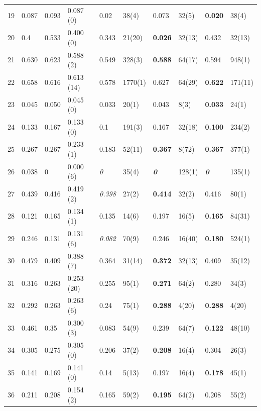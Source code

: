\begin{center}
\begin{supertabular}{|p{0.15cm}|p{1cm}ll|ll|ll|ll|}
19 & 0.087 & 0.093 & 0.087 (0)  & 0.02 & 38(4) & 0.073 & 32(5) & \textbf{0.020} &
38(4)\tabularnewline 


20 & 0.4 & 0.533 & 0.400 (0)  & 0.343 & 21(20) & \textbf{ 0.026}  & 32(13) & 0.432
& 32(13)\tabularnewline 


21 & 0.630 & 0.623 & 0.588 (2)  & 0.549 & 328(3) & \textbf{0.588} & 64(17) &
0.594 & 948(1)\tabularnewline 


22 & 0.658 & 0.616 & 0.613 (14)  & 0.578 & 1770(1) & 0.627 & 64(29) &
\textbf{0.622} & 171(11)\tabularnewline 


23 & 0.045 & 0.050 & 0.045 (0)  & 0.033 & 20(1) & 0.043 & 8(3) & \textbf{0.033} &
24(1)\tabularnewline 


24 & 0.133 & 0.167 & 0.133 (0)  & 0.1 & 191(3) & 0.167 & 32(18) & \textbf{0.100}
& 234(2)\tabularnewline 


25 & 0.267 & 0.267 & 0.233 (1)  & 0.183 & 52(11) &  \textbf{0.367 } & 8(72) &
\textbf{0.367} & 377(1)\tabularnewline 


26 & 0.038 & 0 & 0.000 (6)  & \emph{0} & 35(4) & \textbf{ }\textbf{\emph{0}}\textbf{ }
& 128(1) & \textbf{\emph{0}} & 135(1)\tabularnewline 


27 & 0.439 & 0.416 & 0.419 (2)  & \emph{0.398} & 27(2) & \textbf{ 0.414 } & 32(2) &
0.416 & 80(1)\tabularnewline 


28 & 0.121 & 0.165 & 0.134 (1)  & 0.135 & 14(6) & 0.197 & 16(5) & \textbf{0.165} &
84(31)\tabularnewline 


29 & 0.246 & 0.131 & 0.131 (6)  &  \emph{0.082} & 70(9) & 0.246 & 16(40) &
\textbf{0.180} & 524(1)\tabularnewline 


30 & 0.479 & 0.409 & 0.388 (7)  & 0.364 & 31(14) & \textbf{0.372} & 32(13) &
0.409 & 35(12)\tabularnewline 


31 & 0.316 & 0.263 & 0.253 (20)  & 0.255 & 95(1) & \textbf{0.271} & 64(2) & 0.280
& 34(3)\tabularnewline 


32 & 0.292 & 0.263 & 0.263 (6)  & 0.24 & 75(1) &  \textbf{0.288 } & 4(20) &
\textbf{0.288} & 4(20)\tabularnewline 


33 & 0.461 & 0.35 & 0.300 (3)  & 0.083 & 54(9) &  0.239  & 64(7) & \textbf{0.122} &
48(10)\tabularnewline 


34 & 0.305 & 0.275 & 0.305 (0)  & 0.206 & 37(2) & \textbf{0.208} & 16(4) & 0.304 &
26(3)\tabularnewline 


35 & 0.141 & 0.169 & 0.141 (0)  & 0.14 & 5(13) & 0.197 & 16(4) & \textbf{0.178} &
45(1)\tabularnewline 


36 & 0.211 & 0.208 & 0.154 (2)  & 0.165 & 59(2) & \textbf{0.195} & 64(2) & 0.208
& 55(2)\tabularnewline 



\end{supertabular}
\end{center}
